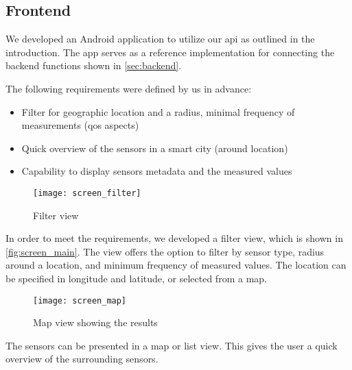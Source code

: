 \subsection{Frontend}\label{sec:frontend}

We developed an Android application to utilize our \gls{api} as outlined in the introduction. The app serves as a reference implementation for connecting the backend functions shown in \autoref{sec:backend}.

The following requirements were defined by us in advance:

\begin{itemize}
    \item Filter for geographic location and a radius, minimal frequency of measurements (\gls{qos} aspects)
    \item Quick overview of the sensors in a smart city (around location)
    \item Capability to display sensors metadata and the measured values
\end{itemize}

\begin{figure}[H]
    \centering
    \texttt{[image: screen\_filter]}
    \caption{Filter view}
    \label{fig:screen_main}
\end{figure}

In order to meet the requirements, we developed a filter view, which is shown in \autoref{fig:screen_main}. The view offers the option to filter by sensor type, radius around a location, and minimum frequency of measured values. The location can be specified in longitude and latitude, or selected from a map.

\begin{figure}[H]
    \centering
    \texttt{[image: screen\_map]}
    \caption{Map view showing the results}
    \label{fig:screen_results_map}
\end{figure}

The sensors can be presented in a map or list view. This gives the user a quick overview of the surrounding sensors.

